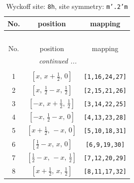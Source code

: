 \documentclass[fleqn,8pt]{jsarticle}
\begin{document}
\begin{longtable}{ccc}
\caption{Wyckoff site: {\tt 8h}, site symmetry: {\tt m'.2'm}}
 \\
 \hline \hline
No. & position & mapping \\ \hline \endfirsthead

\multicolumn{2}{l}{\tablename\ \thetable{}} \\
 \hline \hline
No. & position & mapping \\ \hline \endhead

 \hline \hline
\multicolumn{2}{r}{\footnotesize\it continued ...} \\ \endfoot

 \hline \hline
\multicolumn{2}{r}{} \\ \endlastfoot

1 & $\left[ x,\, x + \frac{1}{2},\, 0 \right]$ & {\tt [1,16,24,27]} \\ \hline
2 & $\left[ x,\, \frac{1}{2} - x,\, \frac{1}{2} \right]$ & {\tt [2,15,21,26]} \\ \hline
3 & $\left[ - x,\, x + \frac{1}{2},\, \frac{1}{2} \right]$ & {\tt [3,14,22,25]} \\ \hline
4 & $\left[ - x,\, \frac{1}{2} - x,\, 0 \right]$ & {\tt [4,13,23,28]} \\ \hline
5 & $\left[ x + \frac{1}{2},\, - x,\, 0 \right]$ & {\tt [5,10,18,31]} \\ \hline
6 & $\left[ \frac{1}{2} - x,\, x,\, 0 \right]$ & {\tt [6,9,19,30]} \\ \hline
7 & $\left[ \frac{1}{2} - x,\, - x,\, \frac{1}{2} \right]$ & {\tt [7,12,20,29]} \\ \hline
8 & $\left[ x + \frac{1}{2},\, x,\, \frac{1}{2} \right]$ & {\tt [8,11,17,32]} \\
\end{longtable}
\renewcommand{\arraystretch}{1.2}
\end{document}
